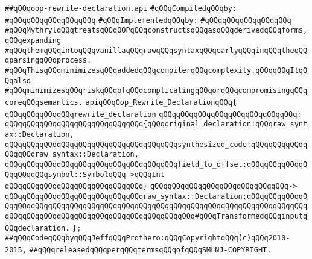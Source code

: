 \label{src/lib/compiler/front/typer/main/oop-rewrite-declaration.api}
\verb|##qQQqoop-rewrite-declaration.api|\newline
\newline
\verb|#qQQqCompiledqQQqby:|\newline
\verb|#qQQqqQQqqQQqqQQqqQQq|\newline
\newline
\verb|#qQQqImplementedqQQqby:|\newline
\verb|#qQQqqQQqqQQqqQQqqQQq|\newline
\newline
\verb|#qQQqMythrylqQQqtreatsqQQqOOPqQQqconstructsqQQqasqQQqderivedqQQqforms,qQQqexpanding|\newline
\verb|#qQQqthemqQQqintoqQQqvanillaqQQqrawqQQqsyntaxqQQqearlyqQQqinqQQqtheqQQqparsingqQQqprocess.|\newline
\verb|#qQQqThisqQQqminimizesqQQqaddedqQQqcompilerqQQqcomplexity.qQQqqQQqItqQQqalso|\newline
\verb|#qQQqminimizesqQQqriskqQQqofqQQqcomplicatingqQQqorqQQqcompromisingqQQqcoreqQQqsemantics.|\newline
\newline
\newline
\verb|apiqQQqOop_Rewrite_DeclarationqQQq{|\newline
\newline
\verb|qQQqqQQqqQQqqQQqrewrite_declaration|\newline
\verb|qQQqqQQqqQQqqQQqqQQqqQQqqQQqqQQq:|\newline
\verb|qQQqqQQqqQQqqQQqqQQqqQQqqQQqqQQq{qQQqoriginal_declaration:qQQqraw_syntax::Declaration,|\newline
\verb|qQQqqQQqqQQqqQQqqQQqqQQqqQQqqQQqqQQqqQQqsynthesized_code:qQQqqQQqqQQqqQQqqQQqraw_syntax::Declaration,|\newline
\verb|qQQqqQQqqQQqqQQqqQQqqQQqqQQqqQQqqQQqqQQqfield_to_offset:qQQqqQQqqQQqqQQqqQQqqQQqsymbol::SymbolqQQq->qQQqInt|\newline
\verb|qQQqqQQqqQQqqQQqqQQqqQQqqQQqqQQq}|\newline
\verb|qQQqqQQqqQQqqQQqqQQqqQQqqQQqqQQq->|\newline
\verb|qQQqqQQqqQQqqQQqqQQqqQQqqQQqqQQqraw_syntax::Declaration;qQQqqQQqqQQqqQQqqQQqqQQqqQQqqQQqqQQqqQQqqQQqqQQqqQQqqQQqqQQqqQQqqQQqqQQqqQQqqQQqqQQqqQQqqQQqqQQqqQQqqQQqqQQqqQQqqQQqqQQqqQQqqQQq#qQQqTransformedqQQqinputqQQqdeclaration.|\newline
\verb|};|\newline
\newline
\newline
\verb|##qQQqCodeqQQqbyqQQqJeffqQQqProthero:qQQqCopyrightqQQq(c)qQQq2010-2015,|\newline
\verb|##qQQqreleasedqQQqperqQQqtermsqQQqofqQQqSMLNJ-COPYRIGHT.|\newline

